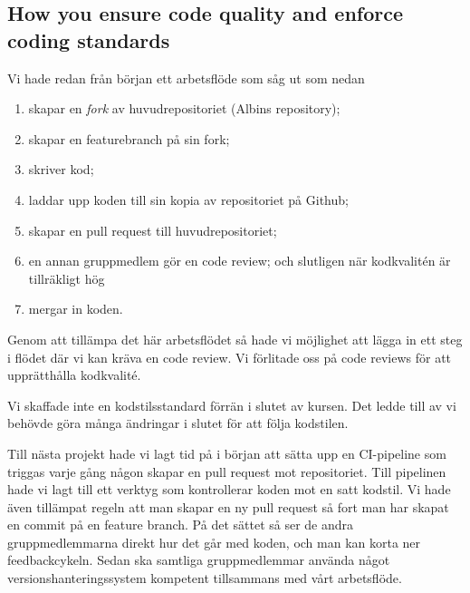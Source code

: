 \documentclass{scrartcl}
\begin{document}




\subsection{How you ensure code quality and enforce coding standards}\label{sec:code-quality-and-coding-standards}

Vi hade redan från början ett arbetsflöde som såg ut som nedan

\begin{enumerate}
    \item skapar en \emph{fork} av huvudrepositoriet (Albins repository);
    \item skapar en featurebranch på sin fork;
    \item skriver kod;
    \item laddar upp koden till sin kopia av repositoriet på Github;
    \item skapar en pull request till huvudrepositoriet;
    \item en annan gruppmedlem gör en code review; och slutligen när kodkvalitén är tillräkligt hög
    \item mergar in koden.
\end{enumerate}

Genom att tillämpa det här arbetsflödet så hade vi möjlighet att lägga in ett steg i flödet där vi kan kräva en code review.
Vi förlitade oss på code reviews för att upprätthålla kodkvalité.

Vi skaffade inte en kodstilsstandard förrän i slutet av kursen.
Det ledde till av vi behövde göra många ändringar i slutet för att följa kodstilen.

Till nästa projekt hade vi lagt tid på i början att sätta upp en CI-pipeline som triggas varje gång någon skapar en pull request mot repositoriet.
Till pipelinen hade vi lagt till ett verktyg som kontrollerar koden mot en satt kodstil.
Vi hade även tillämpat regeln att man skapar en ny pull request så fort man har skapat en commit på en feature branch.
På det sättet så ser de andra gruppmedlemmarna direkt hur det går med koden, och man kan korta ner feedbackcykeln.
Sedan ska samtliga gruppmedlemmar använda något versionshanteringssystem kompetent tillsammans med vårt arbetsflöde.
\end{document}
